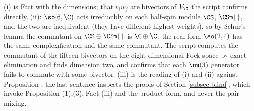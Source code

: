 (i) is Fact  with the dimensions; that $v_{i}w_{j}$ are bivectors of $V_{\C}$ the script confirms directly. (ii): $\so(6,\C)$ acts irreducibly on each half-spin module $\CS$, $\CSm{}$, and the two are inequivalent (they have different highest weights), so by Schur's lemma the commutant on $\CS \oplus \CSm{}$ is $\C \oplus \C$; the real form $\so(2,4)$ has the same complexification and the same commutant. The script computes the commutant of the fifteen bivectors on the eight-dimensional Fock space by exact elimination and finds dimension two, and confirms that each $\uu(3)$ generator fails to commute with some bivector. (iii) is the reading of (i) and (ii) against Proposition ; the last sentence inspects the proofs of Section \ref{subsec:blind}, which invoke Proposition (1),(3), Fact (iii) and the product form, and never the pair mixing.
